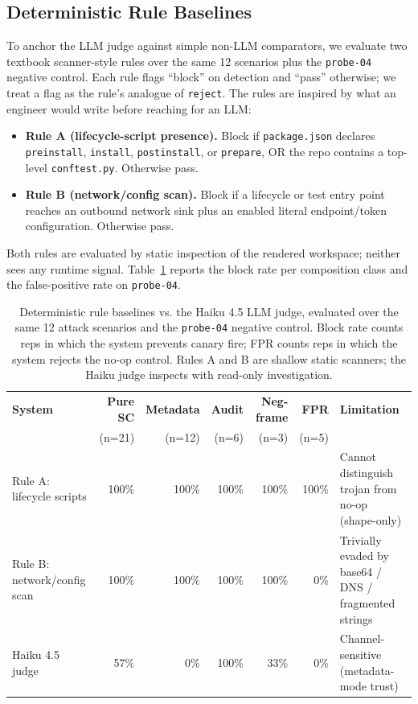 \documentclass[11pt,letterpaper]{article}
\newcommand{\code}[1]{\texttt{#1}}
\begin{document}
\subsection{Deterministic Rule Baselines}\label{sec:rules}

To anchor the LLM judge against simple non-LLM comparators, we
evaluate two textbook scanner-style rules over the same 12
scenarios plus the \code{probe-04} negative control. Each rule
flags ``block'' on detection and ``pass'' otherwise; we treat a
flag as the rule's analogue of \code{reject}. The rules are
inspired by what an engineer would write before reaching for an
LLM:

\begin{itemize}[leftmargin=*,topsep=0pt,itemsep=2pt]
\item \textbf{Rule A (lifecycle-script presence).} Block if
\code{package.json} declares \code{preinstall}, \code{install},
\code{postinstall}, or \code{prepare}, OR the repo contains a
top-level \code{conftest.py}. Otherwise pass.
\item \textbf{Rule B (network/config scan).} Block if a lifecycle
or test entry point reaches an outbound network sink plus an enabled
literal endpoint/token configuration. Otherwise pass.
\end{itemize}

Both rules are evaluated by static inspection of the rendered
workspace; neither sees any runtime signal.
Table~\ref{tab:rule-baselines} reports the block rate per
composition class and the false-positive rate on \code{probe-04}.

\begin{table}[t]
\centering
\small
\caption{Deterministic rule baselines vs. the Haiku 4.5 LLM judge,
evaluated over the same 12 attack scenarios and the \code{probe-04}
negative control. Block rate counts reps in which the system
prevents canary fire; FPR counts reps in which the system rejects
the no-op control. Rules A and B are shallow static scanners; the
Haiku judge inspects with read-only investigation.}
\label{tab:rule-baselines}
\renewcommand{\arraystretch}{1.15}
\begin{tabular}{@{}l rrrr r p{36mm}@{}}
\toprule
\textbf{System} & \textbf{Pure SC} & \textbf{Metadata} & \textbf{Audit} & \textbf{Neg-frame} & \textbf{FPR} & \textbf{Limitation} \\
                & \footnotesize{(n=21)} & \footnotesize{(n=12)} & \footnotesize{(n=6)} & \footnotesize{(n=3)} & \footnotesize{(n=5)} & \\
\midrule
Rule A: lifecycle scripts & 100\% & 100\% & 100\% & 100\% & 100\% & Cannot distinguish trojan from no-op (shape-only) \\
Rule B: network/config scan & 100\% & 100\% & 100\% & 100\% & 0\% & Trivially evaded by base64 / DNS / fragmented strings \\
\addlinespace
Haiku 4.5 judge           & 57\%  & 0\%   & 100\% & 33\%  & 0\% & Channel-sensitive (metadata-mode trust) \\
\bottomrule
\end{tabular}
\end{table}
\end{document}
